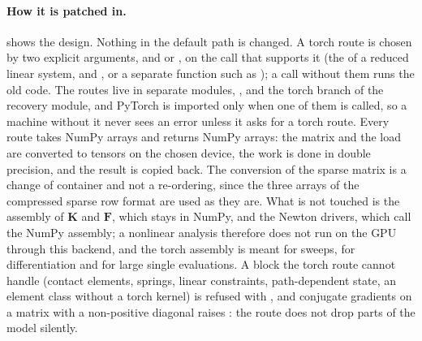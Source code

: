 \paragraph{How it is patched in.}  shows the design. Nothing in the default path is changed. A torch route is chosen by two explicit arguments,  and  or , on the call that supports it (the  of a reduced linear system,  and , or a separate function such as ); a call without them runs the old code. The routes live in separate modules, ,  and the torch branch of the recovery module, and PyTorch is imported only when one of them is called, so a machine without it never sees an error unless it asks for a torch route. Every route takes NumPy arrays and returns NumPy arrays: the matrix and the load are converted to tensors on the chosen device, the work is done in double precision, and the result is copied back. The conversion of the sparse matrix is a change of container and not a re-ordering, since the three arrays of the compressed sparse row format are used as they are. What is not touched is the assembly of $\bm K$ and $\bm F$, which stays in NumPy, and the Newton drivers, which call the NumPy assembly; a nonlinear analysis therefore does not run on the GPU through this backend, and the torch assembly is meant for sweeps, for differentiation and for large single evaluations. A block the torch route cannot handle (contact elements, springs, linear constraints, path-dependent state, an element class without a torch kernel) is refused with , and conjugate gradients on a matrix with a non-positive diagonal raises : the route does not drop parts of the model silently.


